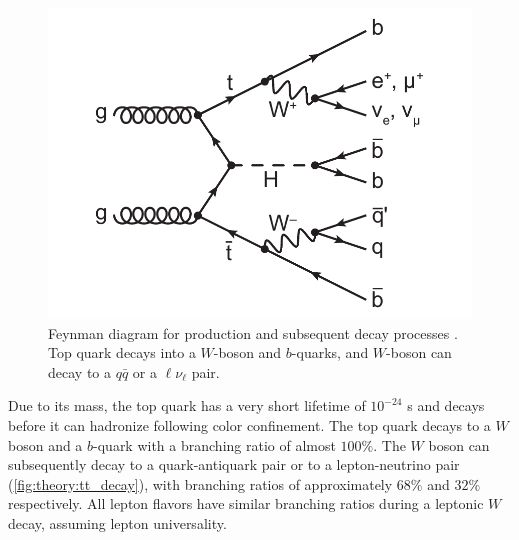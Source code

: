 \documentclass[../thesis.tex]{subfiles}
\begin{document}
\begin{figure}
\begin{center}
\includegraphics[width=\linewidth]{fig/theory_tt_decay.pdf}
\caption[Feynman diagram for \ttbar production and subsequent decay processes. Top quark decays into a $W$-boson and $b$-quarks, and $W$-boson can decay to a $q\bar{q}$ or a $\ell\nu_\ell$ pair.]{\label{fig:theory:tt_decay}Feynman diagram for \ttbar production and subsequent decay processes \citep{theory:ttH_Hbb}. Top quark decays into a $W$-boson and $b$-quarks, and $W$-boson can decay to a $q\bar{q}$ or a $\ell\nu_\ell$ pair.}
\end{center}
\end{figure}

Due to its mass, the top quark has a very short lifetime of $10^{-24}$ s \citep{PDG} and decays before it can hadronize following color confinement. The top quark decays to a $W$ boson and a $b$-quark with a branching ratio of almost $100\%$. The $W$ boson can subsequently decay to a quark-antiquark pair or to a lepton-neutrino pair (\autoref{fig:theory:tt_decay}), with branching ratios of approximately $68\%$ and $32\%$ respectively. All lepton flavors have similar branching ratios during a leptonic $W$ decay, assuming lepton universality.

\end{document}
